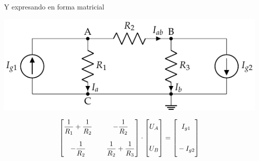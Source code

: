 \documentclass[aspectratio=169, xcolor={usenames,svgnames,dvipsnames}]{beamer}
\begin{document}
\begin{frame}{Y expresando en forma matricial}
    \begin{center}
    \includegraphics[width=.7\linewidth]{../figs/nudos.pdf}
    \end{center}
    \begin{equation*}
      \begin{bmatrix}
        \dfrac{1}{R_1}+\dfrac{1}{R_2} & \quad - \dfrac{1}{R_2}\\[15pt]
        -\dfrac{1}{R_2} & \quad \dfrac{1}{R_2}+\dfrac{1}{R_3}
      \end{bmatrix} \cdot%
      \begin{bmatrix}
        \vphantom{\dfrac{1}{R_1}} U_A\\[15pt]
        \vphantom{\dfrac{1}{R_1}} U_B
      \end{bmatrix} = %
      \begin{bmatrix}
        \vphantom{\dfrac{1}{R_1}} I_{g1}\\[15pt]
        \vphantom{\dfrac{1}{R_1}} -I_{g2}
      \end{bmatrix}
    \end{equation*}
\end{frame}

\end{document}

